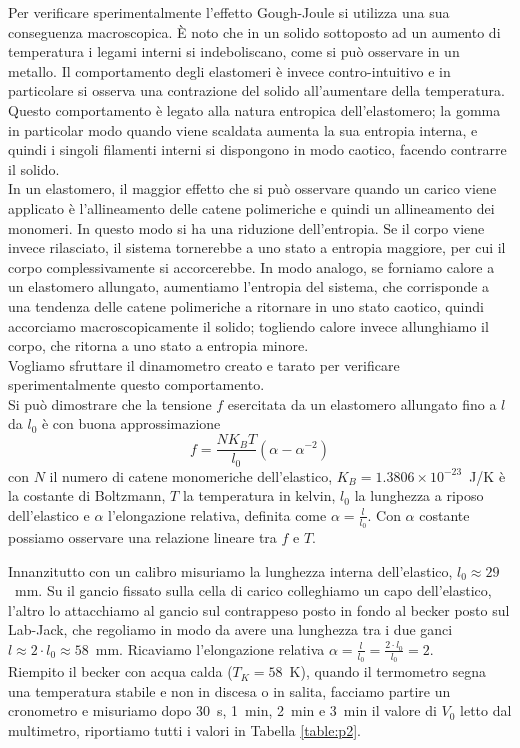 \documentclass[italian, a4paper, 10pt, twocolumn]{../../style/lab_unige}
\newcommand{\reftab}[1]{Tabella {\ref{#1}}}%
\begin{document}
    Per verificare sperimentalmente l'effetto Gough-Joule si utilizza una sua conseguenza macroscopica. È noto che in un solido sottoposto ad un aumento di temperatura i legami interni si indeboliscano, come si può osservare in un metallo. Il comportamento degli elastomeri è invece contro-intuitivo e in particolare si osserva una contrazione del solido all'aumentare della temperatura. Questo comportamento è legato alla natura entropica dell'elastomero; la gomma in particolar modo quando viene scaldata aumenta la sua entropia interna, e quindi i singoli filamenti interni si dispongono in modo caotico, facendo contrarre il solido. \\
    In un elastomero, il maggior effetto che si può osservare quando un carico viene applicato è l'allineamento delle catene polimeriche e quindi un allineamento dei monomeri. In questo modo si ha una riduzione dell'entropia. Se il corpo viene invece rilasciato, il sistema tornerebbe a uno stato a entropia maggiore, per cui il corpo complessivamente si accorcerebbe. In modo analogo, se forniamo calore a un elastomero allungato, aumentiamo l'entropia del sistema, che corrisponde a una tendenza delle catene polimeriche a ritornare in uno stato caotico, quindi accorciamo macroscopicamente il solido; togliendo calore invece allunghiamo il corpo, che ritorna a uno stato a entropia minore.\\
    Vogliamo sfruttare il dinamometro creato e tarato per verificare sperimentalmente questo comportamento.\\
    Si può dimostrare che la tensione $f$ esercitata da un elastomero allungato fino a $l$ da $l_0$ è con buona approssimazione
    \begin{equation}
        f=\frac{NK_BT}{l_0}\left(\alpha-\alpha^{-2}\right)
    \end{equation}
    con $N$ il numero di catene monomeriche dell'elastico, $K_B=1.3806\times10^{-23}$~J/K è la costante di Boltzmann, $T$ la temperatura in kelvin, $l_0$ la lunghezza a riposo dell'elastico e $\alpha$ l'elongazione relativa, definita come $\alpha=\frac{l}{l_{0}}$. Con $\alpha$ costante possiamo osservare una relazione lineare tra $f$ e $T$.
    
    
    Innanzitutto con un calibro misuriamo la lunghezza interna dell'elastico, $l_{0}\approx29$~mm. Su il gancio fissato sulla cella di carico colleghiamo un capo dell'elastico, l'altro lo attacchiamo al gancio sul contrappeso posto in fondo al becker posto sul Lab-Jack, che regoliamo in modo da avere una lunghezza tra i due ganci $l\approx2\cdot l_{0}\approx58$~mm. Ricaviamo l'elongazione relativa $\alpha=\frac{l}{l_{0}}=\frac{2\cdot l_0}{l_0}=2$.\\
    Riempito il becker con acqua calda ($T_K=58$~K), quando il termometro segna una temperatura stabile e non in discesa o in salita, facciamo partire un cronometro e misuriamo dopo 30~s, 1~min, 2~min e 3~min il valore di $V_0$ letto dal multimetro, riportiamo tutti i valori in \reftab{table:p2}.
    
\end{document}
